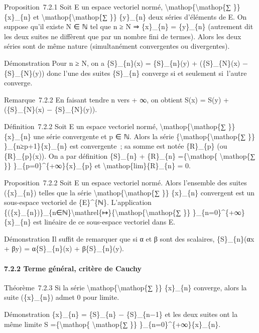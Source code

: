 \documentclass[]{article}
\begin{document}
Proposition~7.2.1 Soit E un espace vectoriel normé,
\textbackslash{}mathop\{\textbackslash{}mathop\{∑ \}\} \{x\}\_\{n\} et
\textbackslash{}mathop\{\textbackslash{}mathop\{∑ \}\} \{y\}\_\{n\} deux
séries d'éléments de E. On suppose qu'il existe N ∈ ℕ tel que n ≥ N ⇒
\{x\}\_\{n\} = \{y\}\_\{n\} (autrement dit les deux suites ne diffèrent
que par un nombre fini de termes). Alors les deux séries sont de même
nature (simultanément convergentes ou divergentes).

Démonstration Pour n ≥ N, on a \{S\}\_\{n\}(x) = \{S\}\_\{n\}(y) +
(\{S\}\_\{N\}(x) − \{S\}\_\{N\}(y)) donc l'une des suites \{S\}\_\{n\}
converge si et seulement si~l'autre converge.

Remarque~7.2.2 En faisant tendre n vers + ∞, on obtient S(x) = S(y) +
(\{S\}\_\{N\}(x) − \{S\}\_\{N\}(y)).

Définition~7.2.2 Soit E un espace vectoriel normé,
\textbackslash{}mathop\{\textbackslash{}mathop\{∑ \}\} \{x\}\_\{n\} une
série convergente et p ∈ ℕ. Alors la série
\{\textbackslash{}mathop\{\textbackslash{}mathop\{∑ \}\}
\}\_\{n≥p+1\}\{x\}\_\{n\} est convergente~; sa somme est notée
\{R\}\_\{p\} (ou \{R\}\_\{p\}(x)). On a par définition \{S\}\_\{n\} +
\{R\}\_\{n\} =\{\textbackslash{}mathop\{ \textbackslash{}mathop\{∑ \}\}
\}\_\{p=0\}\^{}\{+∞\}\{x\}\_\{p\} et
\textbackslash{}mathop\{lim\}\{R\}\_\{n\} = 0.

Proposition~7.2.2 Soit E un espace vectoriel normé. Alors l'ensemble des
suites (\{x\}\_\{n\}) telles que la série
\textbackslash{}mathop\{\textbackslash{}mathop\{∑ \}\} \{x\}\_\{n\}
convergent est un sous-espace vectoriel de \{E\}\^{}\{ℕ\}. L'application
\{(\{x\}\_\{n\})\}\_\{n∈ℕ\}\textbackslash{}mathrel\{↦\}\{\textbackslash{}mathop\{\textbackslash{}mathop\{∑
\}\} \}\_\{n=0\}\^{}\{+∞\}\{x\}\_\{n\} est linéaire de ce sous-espace
vectoriel dans E.

Démonstration Il suffit de remarquer que si α et β sont des scalaires,
\{S\}\_\{n\}(αx + βy) = α\{S\}\_\{n\}(x) + β\{S\}\_\{n\}(y).

\paragraph{7.2.2 Terme général, critère de Cauchy}

Théorème~7.2.3 Si la série
\textbackslash{}mathop\{\textbackslash{}mathop\{∑ \}\} \{x\}\_\{n\}
converge, alors la suite (\{x\}\_\{n\}) admet 0 pour limite.

Démonstration \{x\}\_\{n\} = \{S\}\_\{n\} − \{S\}\_\{n−1\} et les deux
suites ont la même limite S =\{\textbackslash{}mathop\{
\textbackslash{}mathop\{∑ \}\} \}\_\{n=0\}\^{}\{+∞\}\{x\}\_\{n\}.
\end{document}
